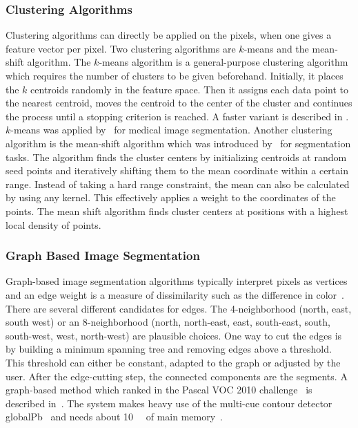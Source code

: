\documentclass[technote,a4paper,leqno]{IEEEtran}
\begin{document}
\subsubsection{Clustering Algorithms}
Clustering algorithms can directly be applied on the pixels, when one gives
a feature vector per pixel. Two clustering algorithms are $k$-means and the
mean-shift algorithm.
The $k$-means algorithm is a general-purpose clustering algorithm which
requires the number of clusters to be given beforehand. Initially, it places
the $k$ centroids randomly in the feature space. Then it assigns each
data point to the nearest centroid, moves the centroid to the center of the
cluster and continues the process until a stopping criterion is reached. A
faster variant is described in \cite{hartigan1975clustering}.
$k$-means was applied by~\cite{chen1998image} for medical image segmentation.
Another clustering algorithm is the mean-shift algorithm which was introduced
by~\cite{comaniciu2002mean} for segmentation tasks. The algorithm finds the
cluster centers by initializing centroids at random seed points and iteratively
shifting them to the mean coordinate within a certain range. Instead of taking
a hard range constraint, the mean can also be calculated by using any kernel.
This effectively applies a weight to the coordinates of the points. The mean
shift algorithm finds cluster centers at positions with a highest local
density of points.
\subsubsection{Graph Based Image Segmentation}%
\label{subsec:graph-based-image-segmentation}%
Graph-based image segmentation algorithms typically interpret pixels as
vertices and an edge weight is a measure of dissimilarity such as the
difference in color~\cite{felzenszwalb2004efficient,FelzenszwalbGraphCode}.
There are several different candidates for edges. The 4-neighborhood (north,
east, south west) or an 8-neighborhood (north, north-east, east, south-east,
south, south-west, west, north-west) are plausible choices.
One way to cut the edges is by building a minimum spanning tree and removing
edges above a threshold. This threshold can either be constant, adapted to the
graph or adjusted by the user. After the edge-cutting step, the connected
components are the segments.
A graph-based method which ranked  in the Pascal VOC 2010
challenge~\cite{everingham2010pascal} is described
in~\cite{carreira2010constrained}. The system makes heavy use of the multi-cue
contour detector globalPb~\cite{4587420} and needs about \SI{10}{\giga\byte}
of main memory~\cite{Carreira2011}.
\end{document}
